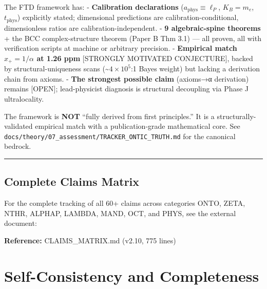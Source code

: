 \documentclass[
  11pt,
  letterpaper,
  twoside,
  openany]{book}
\makeatletter
\let\orig@section\section
\renewcommand{\section}{\needspace{8\baselineskip}\orig@section}
\makeatother
\begin{document}
\begin{tcolorbox}[enhanced jigsaw, colbacktitle=quarto-callout-note-color!10!white, titlerule=0mm, bottomtitle=1mm, bottomrule=.15mm, colback=white, arc=.35mm, breakable, toprule=.15mm, title=\textcolor{quarto-callout-note-color}{\faInfo}\hspace{0.5em}{Framework Status (post-2026-05-03 honest accounting)}, rightrule=.15mm, coltitle=black, leftrule=.75mm, colframe=quarto-callout-note-color-frame, toptitle=1mm, opacityback=0, opacitybacktitle=0.6, left=2mm]

The FTD framework has: - \textbf{Calibration declarations}
(\(a_\mathrm{phys} \equiv \ell_P\), \(K_B = m_e\), \(t_\mathrm{phys}\))
explicitly stated; dimensional predictions are calibration-conditional,
dimensionless ratios are calibration-independent. - \textbf{9
algebraic-spine theorems} + the BCC complex-structure theorem (Paper B
Thm 3.1) --- all proven, all with verification scripts at machine or
arbitrary precision. - \textbf{Empirical match \(x_+ = 1/\alpha\) at
1.26 ppm} {[}STRONGLY MOTIVATED CONJECTURE{]}, backed by
structural-uniqueness scans (\textasciitilde{}\(4{\times}10^5\):1 Bayes
weight) but lacking a derivation chain from axioms. - \textbf{The
strongest possible claim} (axioms→α derivation) remains {[}OPEN{]};
lead-physicist diagnosis is structural decoupling via Phase J
ultralocality.

The framework is \textbf{NOT} ``fully derived from first principles.''
It is a structurally-validated empirical match with a publication-grade
mathematical core. See
\texttt{docs/theory/07\_assessment/TRACKER\_ONTIC\_TRUTH.md} for the
canonical bedrock.

\end{tcolorbox}

\begin{center}\rule{0.5\linewidth}{0.5pt}\end{center}

\section{Complete Claims Matrix}\label{complete-claims-matrix}

For the complete tracking of all 60+ claims across categories ONTO,
ZETA, NTHR, ALPHAP, LAMBDA, MAND, OCT, and PHYS, see the external
document:

\textbf{Reference:} CLAIMS\_MATRIX.md (v2.10, 775 lines)

\chapter{Self-Consistency and Completeness}\label{sec-self-consistency}
\end{document}

